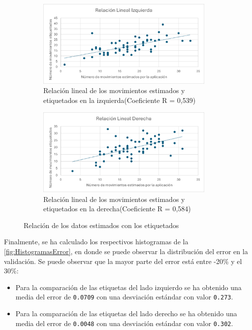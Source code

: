 \begin{figure}[H]
    \centering
    \begin{subfigure}[b]{0.95\textwidth}
        \centering
        \includegraphics[width=0.95\textwidth]{images/7/IzquierdaBien.png}
        \caption{Relación lineal de los movimientos estimados y etiquetados en la izquierda(Coeficiente R = 0,539)}
    \end{subfigure}
    \begin{subfigure}[b]{0.95\textwidth}
        \centering
        \includegraphics[width=0.95\textwidth]{images/7/DerechaBien.png}
        \caption{Relación lineal de los movimientos estimados y etiquetados en la derecha(Coeficiente R = 0,584)}
    \end{subfigure}
    \caption{Relación de los datos estimados con los etiquetados}
    \label{fig:EtiquetadosBien}
\end{figure}
\vspace{3\baselineskip}
\clearpage
Finalmente, se ha calculado los respectivos histogramas de la \autoref{fig:HistogramasError}, en donde se puede observar la distribución del error en la validación. Se puede observar que la mayor parte del error está entre -20\% y el 30\%:
\begin{itemize}
    \item Para la comparación de las etiquetas del lado izquierdo se ha obtenido una media del error de \texttt{0.0709} con una desviación estándar con valor \texttt{0.273}.
    \item Para la comparación de las etiquetas del lado derecho se ha obtenido una media del error de \texttt{0.0048} con una desviación estándar con valor \texttt{0.302}.
\end{itemize}

